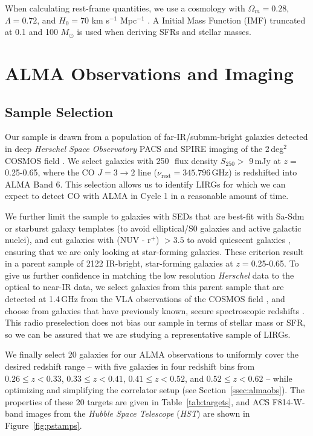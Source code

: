 \documentclass[a4paper,fleqn,usenatbib]{mnras}
\begin{document}
When calculating rest-frame quantities, we use a cosmology with $\Omega_{m} = 0.28$, $\Lambda = 0.72$, and $H_{0} = 70$ km s$^{-1}$ Mpc$^{-1}$ \citep{2013ApJS..208...19H}.  A \citet{2003PASP..115..763C} Initial Mass Function (IMF) truncated at 0.1 and 100 $M_{\odot}$ is used when deriving SFRs and stellar masses.

\section{ALMA Observations and Imaging}
\label{sec:obs}

\subsection{Sample Selection}
\label{ssec:sample}

Our sample is drawn from a population of far-IR/submm-bright galaxies detected in deep {\it Herschel Space Observatory} PACS and SPIRE imaging of the 2\,deg$^2$ COSMOS field \citep{2010MNRAS.409...48R,2011A&A...532A..90L}. We select galaxies with 250\,\micron\ flux density $S_{\mathrm 250} > $ 9\,mJy at $z=$0.25-0.65, where the CO $J=3\rightarrow2$ line ($\nu_{\mathrm{rest}} = 345.796$\,GHz) is redshifted into ALMA Band 6. This selection allows us to identify LIRGs for which we can expect to detect CO with ALMA in Cycle 1 in a reasonable amount of time.

We further limit the sample to galaxies with SEDs that are best-fit with Sa-Sdm or starburst galaxy templates (to avoid elliptical/S0 galaxies and active galactic nuclei), and cut galaxies with (NUV - r$^+$) $>3.5$ to avoid quiescent galaxies \citep{2013A&A...556A..55I}, ensuring that we are only looking at star-forming galaxies. These criterion result in a parent sample of 2122 IR-bright, star-forming galaxies at $z=$0.25-0.65. To give us further confidence in matching the low resolution {\it Herschel} data to the optical to near-IR data, we select galaxies from this parent sample that are detected at 1.4\,GHz from the VLA observations of the COSMOS field \citep[341/2122,][]{2010ApJS..188..384S}, and choose from galaxies that have previously known, secure spectroscopic redshifts \citep[197/341, e.g.][]{2007ApJS..172...70L}. This radio preselection does not bias our sample in terms of stellar mass or SFR, so we can be assured that we are studying a representative sample of LIRGs.

We finally select 20 galaxies for our ALMA observations to uniformly cover the desired redshift range -- with five galaxies in four redshift bins from $0.26 \le z < 0.33$, $0.33 \le z < 0.41$, $0.41 \le z < 0.52$, and $0.52 \le z < 0.62$ -- while optimizing and simplifying the correlator setup (see Section~\ref{ssec:almaobs}). The properties of these 20 targets are given in Table~\ref{tab:targets}, and ACS F814-W-band images from the {\it Hubble Space Telescope} ({\it HST}) are shown in Figure~\ref{fig:pstamps}.
\end{document}
